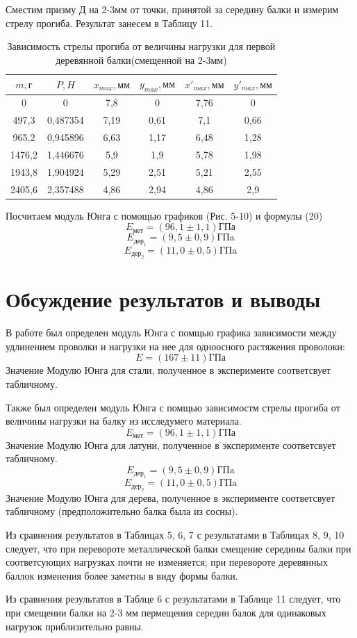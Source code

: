 \documentclass[a4paper,12pt]{article} %
\begin{document}
Сместим призму Д на 2-3мм от точки, принятой за середину балки и измерим стрелу прогиба. Результат занесем в Таблицу 11.
\begin{table}[!h]
\centering
\begin{tabular}{|c|c|c|c|c|c|}
\hline
$m, \text{г}$   & $P,  H$    & $x_{max}, \text{мм}$ &  $y_{max}, \text{мм}$    & $x'_{max}, \text{мм}$ &    $y'_{max}, \text{мм}$  \\ \hline
0      & 0        & 7,8  & 0    & 7,76 & 0    \\ \hline
497,3  & 0,487354  & 7,19 & 0,61 & 7,1  & 0,66 \\ \hline
965,2  & 0,945896  & 6,63 & 1,17 & 6,48 & 1,28 \\ \hline
1476,2 & 1,446676 & 5,9  & 1,9  & 5,78 & 1,98 \\ \hline
1943,8 & 1,904924 & 5,29 & 2,51 & 5,21 & 2,55 \\ \hline
2405,6 & 2,357488 & 4,86 & 2,94 & 4,86 & 2,9  \\ \hline
\end{tabular}
\caption{Зависимость стрелы прогиба от величины нагрузки для первой деревянной балки(смещенной на 2-3мм)}
\end{table}

Посчитаем модуль Юнга с помощью графиков (Рис. 5-10) и формулы (20)
\[E_{\text{мет}} = (96,1\pm1,1)\text{ГПа}\]
\[E_{\text{дер}_1} = (9,5\pm0,9)\text{ГПa}\]
\[E_{\text{дер}_2} = (11,0\pm0,5)\text{ГПa}\]
\section{Обсуждение результатов и выводы}
В работе был определен модуль Юнга с помщью графика зависимости между удлинением проволки и нагрузки на нее для одноосного растяжения проволоки:
\[E = (167\pm11)\text{ГПа}\]
Значение Модулю Юнга для стали, полученное в эксперименте соответсвует табличному.

Также был  определен модуль Юнга с помщью зависимостм стрелы прогиба от величины нагрузки на балку из исследумего материала.
\[E_{\text{мет}} = (96,1\pm1,1)\text{ГПа}\]
Значение Модулю Юнга для латуни, полученное в эксперименте соответсвует табличному.
\[E_{\text{дер}_1} = (9,5\pm0,9)\text{ГПa}\]
\[E_{\text{дер}_2} = (11,0\pm0,5)\text{ГПa}\]
Значение Модулю Юнга для дерева, полученное в эксперименте соответсвует табличному (предположительно балка была из сосны).

Из сравнения результатов в Таблицах 5, 6, 7 с результатами в Таблицах 8, 9, 10 следует, что при перевороте металлической балки смещение середины балки при соответсующих нагрузках почти не изменяется; при перевороте деревянных баллок изменения более заметны в виду формы балки. 

Из сравнения результатов в Таблце 6 с результатами в Таблице 11 следует, что при смещении балки на 2-3 мм пермещения середин балок для одинаковых нагрузок приблизительно равны.
\end{document}
